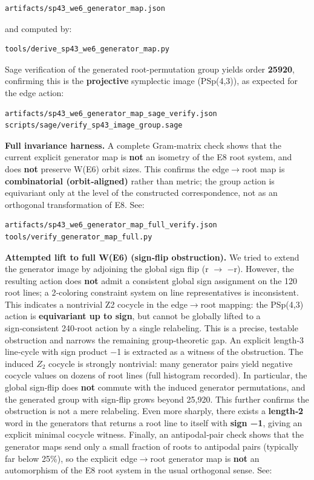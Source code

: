 \documentclass[11pt]{article}
\begin{document}
\begin{verbatim}
artifacts/sp43_we6_generator_map.json
\end{verbatim}

and computed by:

\begin{verbatim}
tools/derive_sp43_we6_generator_map.py
\end{verbatim}

Sage verification of the generated root-permutation group yields order
\textbf{25920}, confirming this is the \textbf{projective} symplectic
image (PSp(4,3)), as expected for the edge action:

\begin{verbatim}
artifacts/sp43_we6_generator_map_sage_verify.json
scripts/sage/verify_sp43_image_group.sage
\end{verbatim}

\textbf{Full invariance harness.} A complete Gram‑matrix check shows
that the current explicit generator map is \textbf{not} an isometry of
the E8 root system, and does \textbf{not} preserve W(E6) orbit sizes.
This confirms the edge\ensuremath{\rightarrow}root map is
\textbf{combinatorial (orbit‑aligned)} rather than metric; the group
action is equivariant only at the level of the constructed
correspondence, not as an orthogonal transformation of E8. See:

\begin{verbatim}
artifacts/sp43_we6_generator_map_full_verify.json
tools/verify_generator_map_full.py
\end{verbatim}

\textbf{Attempted lift to full W(E6) (sign‑flip obstruction).} We tried
to extend the generator image by adjoining the global sign flip (r
\ensuremath{\rightarrow} −r). However, the resulting action does
\textbf{not} admit a consistent global sign assignment on the 120 root
lines; a 2‑coloring constraint system on line representatives is
inconsistent. This indicates a nontrivial Z2 cocycle in the
edge\ensuremath{\rightarrow}root mapping: the PSp(4,3) action is
\textbf{equivariant up to sign}, but cannot be globally lifted to a
sign‑consistent 240‑root action by a single relabeling. This is a
precise, testable obstruction and narrows the remaining group‑theoretic
gap. An explicit length‑3 line‑cycle with sign product −1 is extracted
as a witness of the obstruction. The induced \(Z_{2}\) cocycle is
strongly nontrivial: many generator pairs yield negative cocycle values
on dozens of root lines (full histogram recorded). In particular, the
global sign‑flip does \textbf{not} commute with the induced generator
permutations, and the generated group with sign‑flip grows beyond
25,920. This further confirms the obstruction is not a mere relabeling.
Even more sharply, there exists a \textbf{length‑2} word in the
generators that returns a root line to itself with \textbf{sign −1},
giving an explicit minimal cocycle witness. Finally, an antipodal‑pair
check shows that the generator maps send only a small fraction of roots
to antipodal pairs (typically far below 25\%), so the explicit
edge\ensuremath{\rightarrow}root generator map is \textbf{not} an
automorphism of the E8 root system in the usual orthogonal sense. See:
\end{document}
